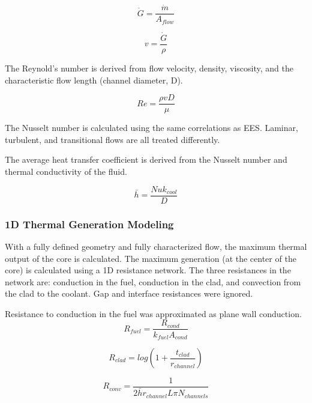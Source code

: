 \begin{equation}
    \dot{G} = \frac{\dot{m}}{A_{flow}}
\end{equation}

\begin{equation}
    v = \frac{\dot{G}}{\rho}
\end{equation}

The Reynold's number is derived from flow velocity, density, viscosity, and the
characteristic flow length (channel diameter, D).

\begin{equation}
    Re = \frac{\rho v D}{\mu}
\end{equation}

The Nusselt number is calculated using the same correlations as EES. Laminar,
turbulent, and transitional flows are all treated differently.

The average heat transfer coefficient is derived from the Nusselt number and
thermal conductivity of the fluid.

\begin{equation}
    \bar{h} = \frac{Nu k_{cool}}{D}
\end{equation}

\subsubsection{1D Thermal Generation Modeling}

With a fully defined geometry and fully characterized flow, the maximum thermal
output of the core is calculated. The maximum generation (at the center of the
core) is calculated using a 1D resistance network. The three resistances in the
network are: conduction in the fuel, conduction in the clad, and convection from
the clad to the coolant. Gap and interface resistances were ignored.

Resistance to conduction in the fuel was approximated as plane wall conduction.
\begin{equation}
    R_{fuel} =  \frac{R_{cond}}{k_{fuel}A_{cond}}
\end{equation}

\begin{equation}
    R_{clad} = log(1+\frac{t_{clad}}{r_{channel}})
\end{equation}

\begin{equation}
    R_{conv} = \frac{1}{2\bar{h}r_{channel}L\pi N_{channels}}
\end{equation}

